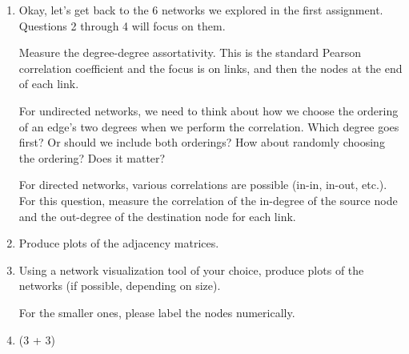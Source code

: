 \begin{enumerate}

\item
  Okay, let's get back to the 6 networks we explored in
  the first assignment.  Questions 2 through 4 will
  focus on them.
  
  Measure the degree-degree assortativity.
  This is the standard Pearson correlation coefficient
  and the focus is on links, and then the nodes at the
  end of each link.

  For undirected networks, we need to think about
  how we choose the ordering of an edge's two degrees
  when we perform the correlation.  Which degree
  goes first?  Or should we include both orderings?
  How about randomly choosing the ordering?
  Does it matter?

  For directed networks, various correlations
  are possible (in-in, in-out, etc.).  
  For this question, measure the correlation
  of the in-degree of the source
  node and the out-degree of the destination node
  for each link.

  
   \solutionstart


   \solutionend

\item   
  Produce plots of the adjacency matrices.

  
   \solutionstart


   \solutionend

\item   
  Using a network visualization tool of your choice,
  produce plots of the networks (if possible, depending on size).

  For the smaller ones, 
  please label the nodes
  numerically.

  
   \solutionstart


   \solutionend


\item (3 + 3)


\end{enumerate}

